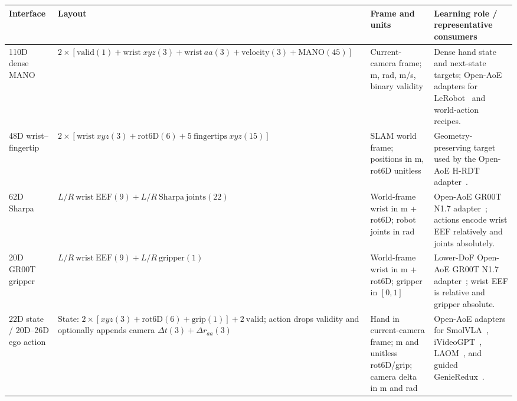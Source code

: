 \noindent\begin{minipage}{\textwidth}
\centering
{}
\label{tab:aoe_action_representations}
\footnotesize
\setlength{\tabcolsep}{3.5pt}
\begin{tabularx}{\textwidth}{>{\raggedright\arraybackslash}p{2.0cm} >{\raggedright\arraybackslash}p{4.45cm} >{\raggedright\arraybackslash}p{3.25cm} >{\raggedright\arraybackslash}X}
\toprule
Interface & Layout & Frame and units & Learning role / representative consumers \\
\midrule
110D dense MANO~\cite{mano2017} & $2\!\times\![\mathrm{valid}(1)+\mathrm{wrist}\ xyz(3)+\mathrm{wrist}\ aa(3)+\mathrm{velocity}(3)+\mathrm{MANO}(45)]$ & Current-camera frame; m, rad, m/s, binary validity & Dense hand state and next-state targets; Open-AoE adapters for LeRobot~\cite{cadene2026lerobot} and world-action recipes. \\
\midrule
48D wrist--fingertip & $2\!\times\![\mathrm{wrist}\ xyz(3)+\mathrm{rot6D}(6)+5\ \mathrm{fingertips}\ xyz(15)]$ & SLAM world frame; positions in m, rot6D unitless & Geometry-preserving target used by the Open-AoE H-RDT adapter~\cite{hrdt2025}. \\
\midrule
62D Sharpa & $L/R\ \mathrm{wrist\ EEF}(9)+L/R\ \mathrm{Sharpa\ joints}(22)$ & World-frame wrist in m + rot6D; robot joints in rad & Open-AoE GR00T N1.7 adapter~\cite{grootn172026}; actions encode wrist EEF relatively and joints absolutely. \\
\midrule
20D GR00T gripper & $L/R\ \mathrm{wrist\ EEF}(9)+L/R\ \mathrm{gripper}(1)$ & World-frame wrist in m + rot6D; gripper in $[0,1]$ & Lower-DoF Open-AoE GR00T N1.7 adapter~\cite{grootn172026}; wrist EEF is relative and gripper absolute. \\
\midrule
22D state / 20D--26D ego action & State: $2\!\times\![xyz(3)+\mathrm{rot6D}(6)+\mathrm{grip}(1)]+2\ \mathrm{valid}$; action drops validity and optionally appends camera $\Delta t(3)+\Delta r_{aa}(3)$ & Hand in current-camera frame; m and unitless rot6D/grip; camera delta in m and rad & Open-AoE adapters for SmolVLA~\cite{smolvla2025}, iVideoGPT~\cite{ivideogpt2024}, LAOM~\cite{laom2025}, and guided GenieRedux~\cite{genieredux2024}. \\
\bottomrule
\end{tabularx}
\end{minipage}


